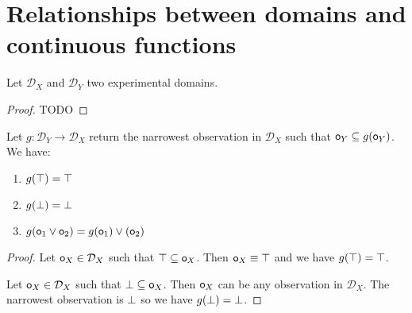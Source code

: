 \documentclass[11pt,letterpaper,fleqn]{memoir} %
\begin{document}
\section{Relationships between domains and continuous functions}


\begin{mathSection}
	\begin{defn}
		Let $\mathcal{D}_X$ and $\mathcal{D}_Y$ two experimental domains.
	\end{defn}
	\begin{prop}
		
	\end{prop}
	\begin{proof}
		TODO
	\end{proof}
\end{mathSection}

\begin{mathSection}
	\begin{prop}
		Let $g : \mathcal{D}_Y \to \mathcal{D}_X$ return the narrowest observation in $\mathcal{D}_X$ such that $\mathsf{o}_Y \subseteq g(\mathsf{o}_Y)$. We have:
		\begin{enumerate}
			\item $g(\top) = \top$
			\item $g(\bot) = \bot$
			\item $g(\mathsf{o}_1 \vee \mathsf{o}_2) = g(\mathsf{o}_1) \vee (\mathsf{o}_2)$
		\end{enumerate}
	\end{prop}
	\begin{proof}
		Let $\mathsf{o}_X \in \mathcal{D}_X$ such that $\top \subseteq \mathsf{o}_X$. Then $\mathsf{o}_X \equiv \top$ and we have $g(\top) = \top$.
		
		Let $\mathsf{o}_X \in \mathcal{D}_X$ such that $\bot \subseteq \mathsf{o}_X$. Then $\mathsf{o}_X$ can be any observation in $\mathcal{D}_X$. The narrowest observation is $\bot$ so we have $g(\bot) = \bot$.
		

\end{proof}
\end{mathSection}
\end{document}
